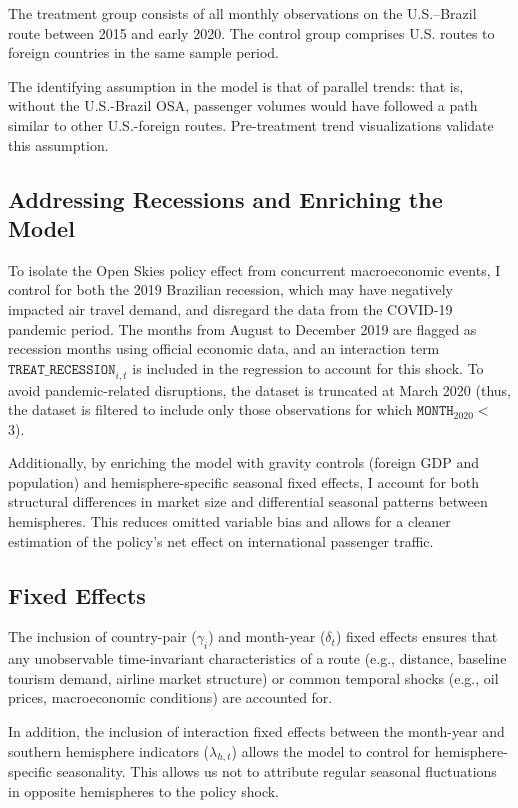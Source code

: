 \documentclass[12pt]{article}
\begin{document}
The treatment group consists of all monthly observations on the U.S.–Brazil route between 2015 and early 2020. The control group comprises U.S. routes to foreign countries in the same sample period. 

The identifying assumption in the model is that of parallel trends: that is, without the U.S.-Brazil OSA, passenger volumes would have followed a path similar to other U.S.-foreign routes. Pre-treatment trend visualizations validate this assumption.

\subsection{Addressing Recessions and Enriching the Model}

To isolate the Open Skies policy effect from concurrent macroeconomic events, I control for both the 2019 Brazilian recession, which may have negatively impacted air travel demand, and disregard the data from the COVID-19 pandemic period. The months from August to December 2019 are flagged as recession months using official economic data, and an interaction term $\texttt{TREAT\_RECESSION}_{i,t}$ is included in the regression to account for this shock. To avoid pandemic-related disruptions, the dataset is truncated at March 2020 (thus, the dataset is filtered to include only those observations for which $\texttt{MONTH}_{2020} <$  3). 

Additionally, by enriching the model with gravity controls (foreign GDP and population) and hemisphere-specific seasonal fixed effects, I account for both structural differences in market size and differential seasonal patterns between hemispheres. This reduces omitted variable bias and allows for a cleaner estimation of the policy’s net effect on international passenger traffic.

\subsection{Fixed Effects}

The inclusion of country-pair ($\gamma_i$) and month-year ($\delta_t$) fixed effects ensures that any unobservable time-invariant characteristics of a route (e.g., distance, baseline tourism demand, airline market structure) or common temporal shocks (e.g., oil prices, macroeconomic conditions) are accounted for. 

In addition, the inclusion of interaction fixed effects between the month-year and southern hemisphere indicators ($\lambda_{h,t}$) allows the model to control for hemisphere-specific seasonality. This allows us not to attribute regular seasonal fluctuations in opposite hemispheres to the policy shock.
\end{document}
